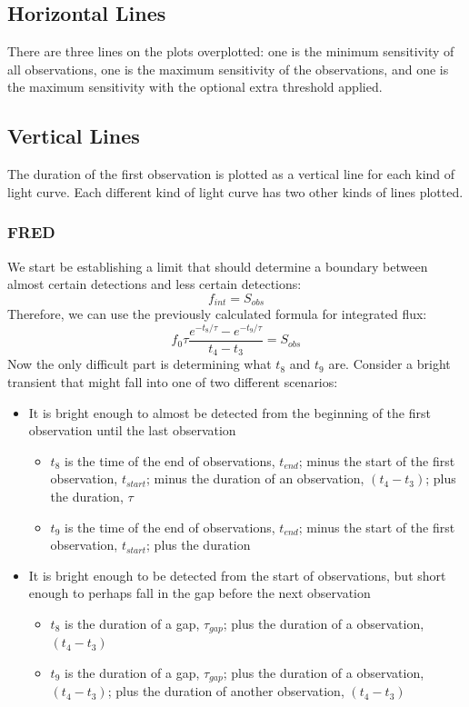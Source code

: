 \documentclass{article}
\begin{document}
\subsection{Horizontal Lines}
There are three lines on the plots overplotted: one is the minimum sensitivity of all observations, one is the maximum sensitivity of the observations, and one is the maximum sensitivity with the optional extra threshold applied.

\subsection{Vertical Lines}
The duration of the first observation is plotted as a vertical line for each kind of light curve. Each different kind of light curve has two other kinds of lines plotted.

\subsubsection{FRED}
We start be establishing a limit that should determine a boundary between almost certain detections and less certain detections:
\[f_{int} = S_{obs}\]
Therefore, we can use the previously calculated formula for integrated flux:
\[f_0\tau \frac{e^{-t_{8}/\tau}-e^{-t_{9}/\tau}}{t_4-t_3} = S_{obs}\]
Now the only difficult part is determining what $t_8$ and $t_9$ are. Consider a bright transient that might fall into one of two different scenarios:
\begin{itemize}
	\item It is bright enough to almost be detected from the beginning of the first observation until the last observation \begin{itemize}
		\item $t_8$ is the time of the end of observations, $t_{end}$; minus the start of the first observation, $t_{start}$; minus the duration of an observation, $(t_4-t_3)$; plus the duration, $\tau$
		\item $t_9$ is the time of the end of observations,  $t_{end}$; minus the start of the first observation, $t_{start}$; plus the duration
		\end{itemize}
	\item It is bright enough to be detected from the start of observations, but short enough to perhaps fall in the gap before the next observation\begin{itemize}
		\item $t_8$ is the duration of a gap, $\tau_{gap}$; plus the duration of a observation, $(t_4-t_3)$
		\item $t_9$ is the duration of a gap, $\tau_{gap}$; plus the duration of a observation, $(t_4-t_3)$; plus the duration of another observation, $(t_4-t_3)$
	\end{itemize} 
	\end{itemize}
\end{document}
